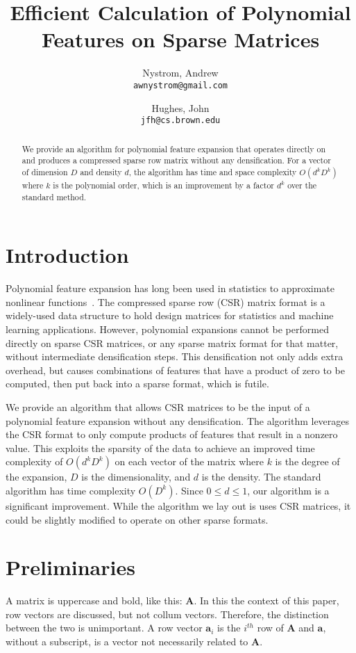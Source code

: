 \documentclass{article} %
\title{Efficient Calculation of Polynomial Features on Sparse Matrices}
\author{
  Nystrom, Andrew\\
  \texttt{awnystrom@gmail.com}
  \and
  Hughes, John\\
  \texttt{jfh@cs.brown.edu}
}
\begin{document}
\maketitle

\begin{abstract}
We provide an algorithm for polynomial feature expansion that operates directly on and produces a compressed sparse row matrix without any densification.
For a vector of dimension $D$ and density $d$, the algorithm has time and space complexity $O(d^kD^k)$ where $k$ is the polynomial order, which is an improvement by a factor $d^k$ over the standard method.
\end{abstract}


\section{Introduction}

Polynomial feature expansion has long been used in statistics to approximate nonlinear functions~\cite{gergonne1974application, smith1918standard}.
The compressed sparse row (CSR) matrix format is a widely-used data structure to hold design matrices for statistics and machine learning applications.
However, polynomial expansions cannot be performed directly on sparse CSR matrices, or any sparse matrix format for that matter, without intermediate densification steps.
This densification not only adds extra overhead, but causes combinations of features that have a product of zero to be computed, then put back into a sparse format, which is futile.

We provide an algorithm that allows CSR matrices to be the input of a polynomial feature expansion without any densification.
The algorithm leverages the CSR format to only compute products of features that result in a nonzero value.
This exploits the sparsity of the data to achieve an improved time complexity of $O(d^kD^k)$ on each vector of the matrix where $k$ is the degree of the expansion, $D$ is the dimensionality, and $d$ is the density.
The standard algorithm has time complexity $O(D^k)$.
Since $0 \le d \le 1$, our algorithm is a significant improvement.
While the algorithm we lay out is uses CSR matrices, it could be slightly modified to operate on other sparse formats.

\section{Preliminaries}
A matrix is uppercase and bold, like this: $\bm{A}$.
In this the context of this paper, row vectors are discussed, but not collum vectors.
Therefore, the distinction between the two is unimportant.
A row vector $\bm{a}_i$ is the $i^{th}$ row of $\bm{A}$ and $\bm{a}$, without a subscript, is a vector not necessarily related to $\bm{A}$.
\end{document}
